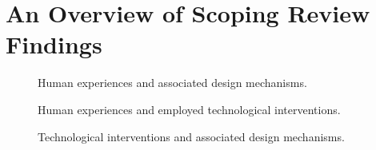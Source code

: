 \section{An Overview of Scoping Review Findings}
\label{sec:appendix-unfolded-sankey}
\begin{widefigure}[tbp]
  \centering

  \begin{subfigure}{.5\linewidth}
    \centering
    
    \caption{Human experiences and associated design mechanisms.}
    \label{fig:sankey-experiences}
  \end{subfigure}

  \vspace{.\baselineskip}

  \begin{subfigure}{.5\linewidth}
    \centering
    
    \caption{Human experiences and employed technological interventions.}
    \label{fig:sankey-mechanisms}
  \end{subfigure}

  \vspace{.8\baselineskip}

  \begin{subfigure}{.5\linewidth}
    \centering
    
    \caption{Technological interventions and associated design mechanisms.}
    \label{fig:sankey-interventions}
  \end{subfigure}

  \caption{An unfolded representation of the scoping review findings, showing relationships between human experiences, design mechanisms, and technological interventions.}
  \label{fig:appendix-findings-overview}
\end{widefigure}
